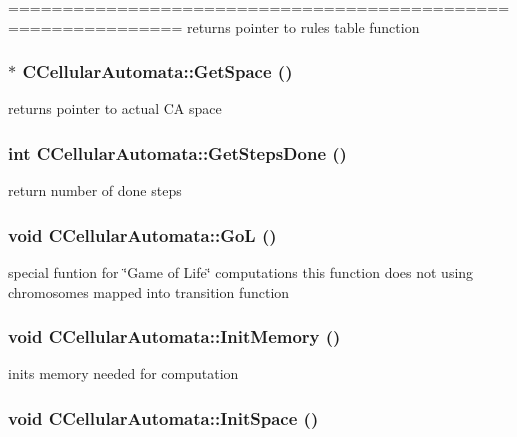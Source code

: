 ============================================================== returns pointer to rules table function \hypertarget{classCCellularAutomata_a811ef34c9aac8e7c9d9dffc1cf69b959}{
\subsubsection[{GetSpace}]{ $\ast$ CCellularAutomata::GetSpace ()}}
\label{classCCellularAutomata_a811ef34c9aac8e7c9d9dffc1cf69b959}
returns pointer to actual CA space \hypertarget{classCCellularAutomata_a4de26e7af894bb68740fb88e5e84bde7}{
\subsubsection[{GetStepsDone}]{\setlength{\rightskip}{0pt plus 5cm}int CCellularAutomata::GetStepsDone ()}}
\label{classCCellularAutomata_a4de26e7af894bb68740fb88e5e84bde7}
return number of done steps \hypertarget{classCCellularAutomata_a02b47aed358ce08d72171ef555bbe2d3}{
\subsubsection[{GoL}]{\setlength{\rightskip}{0pt plus 5cm}void CCellularAutomata::GoL ()}}
\label{classCCellularAutomata_a02b47aed358ce08d72171ef555bbe2d3}
special funtion for \char`\"{}Game of Life\char`\"{} computations this function does not using chromosomes mapped into transition function \hypertarget{classCCellularAutomata_ade214ca0b4f554561de04ad477ae37c7}{
\subsubsection[{InitMemory}]{\setlength{\rightskip}{0pt plus 5cm}void CCellularAutomata::InitMemory ()}}
\label{classCCellularAutomata_ade214ca0b4f554561de04ad477ae37c7}
inits memory needed for computation \hypertarget{classCCellularAutomata_ab1df4fc7a5d32eed82d62e99aaec3f1f}{
\subsubsection[{InitSpace}]{\setlength{\rightskip}{0pt plus 5cm}void CCellularAutomata::InitSpace ()}}
